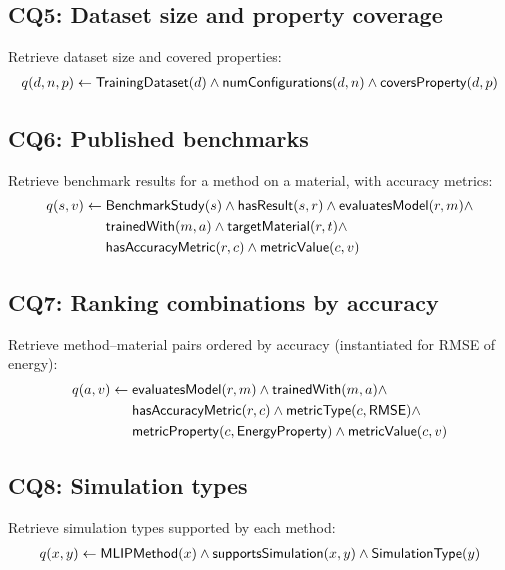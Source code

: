 \subsection{CQ5: Dataset size and property coverage}

Retrieve dataset size and covered properties:
\begin{align*}
  q(d, n, p) \leftarrow \mathsf{TrainingDataset}(d) \wedge \mathsf{numConfigurations}(d, n) \wedge \mathsf{coversProperty}(d, p)
\end{align*}

\subsection{CQ6: Published benchmarks}

Retrieve benchmark results for a method on a material, with accuracy
metrics:
\begin{align*}
  q(s, v) \leftarrow{} & \mathsf{BenchmarkStudy}(s) \wedge \mathsf{hasResult}(s, r) \wedge \mathsf{evaluatesModel}(r, m) \wedge \\
    & \mathsf{trainedWith}(m, a) \wedge \mathsf{targetMaterial}(r, t) \wedge \\
    & \mathsf{hasAccuracyMetric}(r, c) \wedge \mathsf{metricValue}(c, v)
\end{align*}

\subsection{CQ7: Ranking combinations by accuracy}

Retrieve method--material pairs ordered by accuracy (instantiated for
RMSE of energy):
\begin{align*}
  q(a, v) \leftarrow{} & \mathsf{evaluatesModel}(r, m) \wedge \mathsf{trainedWith}(m, a) \wedge \\
    & \mathsf{hasAccuracyMetric}(r, c) \wedge \mathsf{metricType}(c, \mathsf{RMSE}) \wedge \\
    & \mathsf{metricProperty}(c, \mathsf{EnergyProperty}) \wedge \mathsf{metricValue}(c, v)
\end{align*}

\subsection{CQ8: Simulation types}

Retrieve simulation types supported by each method:
\begin{align*}
  q(x, y) \leftarrow \mathsf{MLIPMethod}(x) \wedge \mathsf{supportsSimulation}(x, y) \wedge \mathsf{SimulationType}(y)
\end{align*}
